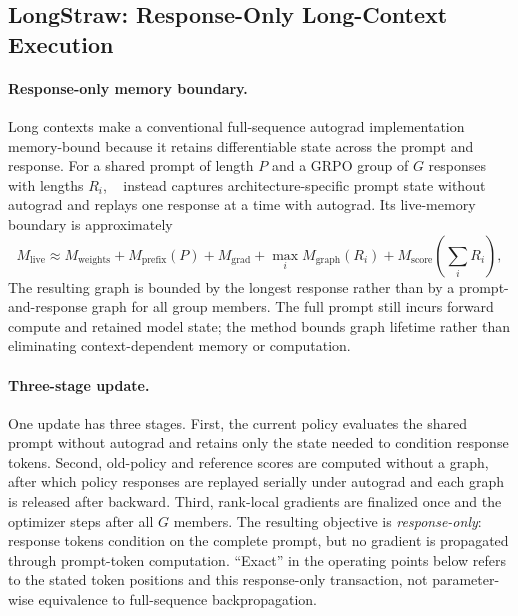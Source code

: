 \subsection{LongStraw: Response-Only Long-Context Execution}
\label{sec:infra_longstraw}

\paragraph{Response-only memory boundary.}
Long contexts make a conventional full-sequence autograd implementation
memory-bound because it retains differentiable state across the prompt and
response. For a shared prompt of length $P$ and a GRPO group of $G$ responses
with lengths $R_i$, \longstraw{}~\citep{zhou2026longstrawlongcontextrl2m}
instead captures architecture-specific prompt state without autograd and
replays one response at a time with autograd. Its live-memory boundary is
approximately
\begin{equation}
  M_{\mathrm{live}} \approx M_{\mathrm{weights}} + M_{\mathrm{prefix}}(P)
  + M_{\mathrm{grad}} + \max_i M_{\mathrm{graph}}(R_i)
  + M_{\mathrm{score}}\!\left(\sum_i R_i\right),
  \label{eq:longstraw-live-memory}
\end{equation}
The resulting graph is bounded by the longest response rather than by a
prompt-and-response graph for all group members. The full prompt still incurs
forward compute and retained model state; the method bounds graph lifetime
rather than eliminating context-dependent memory or computation.

\paragraph{Three-stage update.}
One update has three stages. First, the current policy evaluates the shared
prompt without autograd and retains only the state needed to condition response
tokens. Second, old-policy and reference scores are computed without a graph,
after which policy responses are replayed serially under autograd and each graph
is released after backward. Third, rank-local gradients are finalized once and
the optimizer steps after all $G$ members. The resulting objective is
\emph{response-only}: response tokens condition on the complete prompt, but no
gradient is propagated through prompt-token computation. ``Exact'' in the
operating points below refers to the stated token positions and this
response-only transaction, not parameter-wise equivalence to full-sequence
backpropagation.

